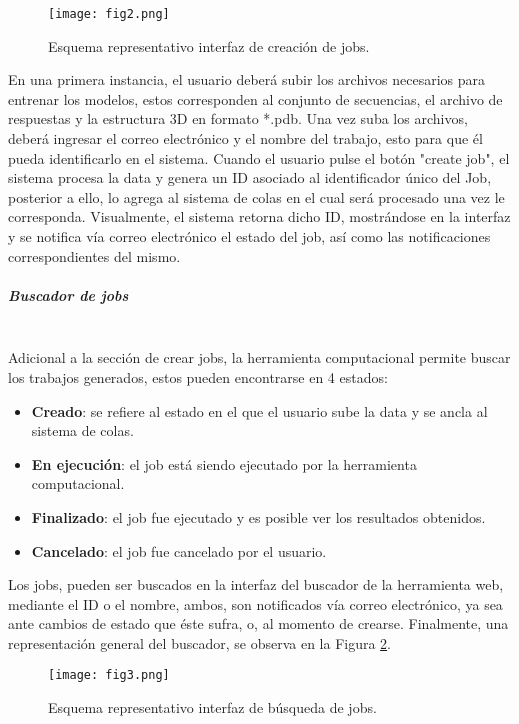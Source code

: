 \begin{figure}[!h]
	
	\centering
	\texttt{[image: fig2.png]}
	\caption{Esquema representativo interfaz de creación de jobs.}
	\label{cap4:fig2}
\end{figure}

En una primera instancia, el usuario deberá subir los archivos necesarios para entrenar los modelos, estos corresponden al conjunto de secuencias, el archivo de respuestas y la estructura 3D en formato *.pdb. Una vez suba los archivos, deberá ingresar el correo electrónico y el nombre del trabajo, esto para que él pueda identificarlo en el sistema. Cuando el usuario pulse el botón "create job", el sistema procesa la data y genera un ID asociado al identificador único del Job, posterior a ello, lo agrega al sistema de colas en el cual será procesado una vez le corresponda. Visualmente, el sistema retorna dicho ID, mostrándose en la interfaz y se notifica vía correo electrónico el estado del job, así como las notificaciones correspondientes del mismo.

\subparagraph{Buscador de jobs\\\\}

Adicional a la sección de crear jobs, la herramienta computacional permite buscar los trabajos generados, estos pueden encontrarse en 4 estados:

\begin{itemize}
	
	\item \textbf{Creado}: se refiere al estado en el que el usuario sube la data y se ancla al sistema de colas.
	\item \textbf{En ejecución}: el job está siendo ejecutado por la herramienta computacional. 
	\item \textbf{Finalizado}: el job fue ejecutado y es posible ver los resultados obtenidos.
	\item \textbf{Cancelado}: el job fue cancelado por el usuario.
\end{itemize}

Los jobs, pueden ser buscados en la interfaz del buscador de la herramienta web, mediante el ID o el nombre, ambos, son notificados vía correo electrónico, ya sea ante cambios de estado que éste sufra, o, al momento de crearse. Finalmente, una representación general del buscador, se observa en la Figura \ref{cap4:fig3}.

\begin{figure}[!h]
	
	\centering
	\texttt{[image: fig3.png]}
	\caption{Esquema representativo interfaz de búsqueda de jobs.}
	\label{cap4:fig3}
\end{figure}

